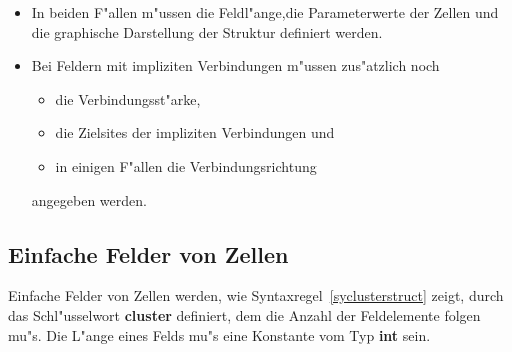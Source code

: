 \begin{itemize}
  \item In beiden F"allen m"ussen die
Feldl"ange,die Parameterwerte der Zellen und 
	die graphische
Darstellung der Struktur definiert werden.  
  \item Bei Feldern mit impliziten Verbindungen m"ussen zus"atzlich noch
 	\begin{itemize}
  	  \item die Verbindungsst"arke,
  	  \item die Zielsites der impliziten Verbindungen und
  	  \item in einigen F"allen die Verbindungsrichtung
	\end{itemize}
	angegeben werden.
\end{itemize}


\subsection{Einfache Felder von Zellen}
\label{EinfacheFelder}

Einfache Felder von Zellen werden,
wie Syntaxregel~\ref{syclusterstruct} zeigt, durch das Schl"usselwort
{\bf cluster} definiert, dem die Anzahl der
Feldelemente folgen mu"s.  Die L"ange eines Felds  mu"s eine Konstante vom Typ
{\bf int} sein.

\begin{center}
\end{center}



